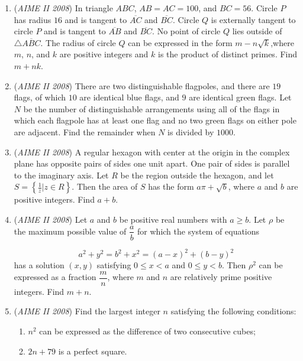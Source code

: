 \begin{enumerate}
 

	\item (\textit{AIME II 2008}) In triangle $ABC$, $AB = AC = 100$, and $BC = 56$. Circle $P$ has radius $16$ and is tangent to $\overline{AC}$ and $\overline{BC}$. Circle $Q$ is externally tangent to circle $P$ and is tangent to $\overline{AB}$ and $\overline{BC}$. No point of circle $Q$ lies outside of $\bigtriangleup\overline{ABC}$. The radius of circle $Q$ can be expressed in the form $m - n\sqrt{k}$,where $m$, $n$, and $k$ are positive integers and $k$ is the product of distinct primes. Find $m +nk$.


 

	\item (\textit{AIME II 2008}) There are two distinguishable flagpoles, and there are $19$ flags, of which $10$ are identical blue flags, and $9$ are identical green flags. Let $N$ be the number of distinguishable arrangements using all of the flags in which each flagpole has at least one flag and no two green flags on either pole are adjacent. Find the remainder when $N$ is divided by $1000$.


 

	\item (\textit{AIME II 2008}) A regular hexagon with center at the origin in the complex plane has opposite pairs of sides one unit apart. One pair of sides is parallel to the imaginary axis. Let $R$ be the region outside the hexagon, and let $S = \left\lbrace\frac{1}{z}|z \in R\right\rbrace$. Then the area of $S$ has the form $a\pi + \sqrt{b}$, where $a$ and $b$ are positive integers. Find $a + b$.


 

	\item (\textit{AIME II 2008}) Let $a$ and $b$ be positive real numbers with $a \ge b$. Let $\rho$ be the maximum possible value of $\dfrac{a}{b}$ for which the system of equations

 \[a^2 + y^2 = b^2 + x^2 = (a-x)^2 + (b-y)^2\]
has a solution $(x,y)$ satisfying $0 \le x < a$ and $0 \le y < b$. Then $\rho^2$ can be expressed as a fraction $\dfrac{m}{n}$, where $m$ and $n$ are relatively prime positive integers. Find $m + n$.


 

	\item (\textit{AIME II 2008}) Find the largest integer $n$ satisfying the following conditions:


 
            \begin{enumerate}[label=(\roman*)]
                \item  $n^2$ can be expressed as the difference of two consecutive cubes;
\item  $2n + 79$ is a perfect square.
            \end{enumerate}
            

\end{enumerate}